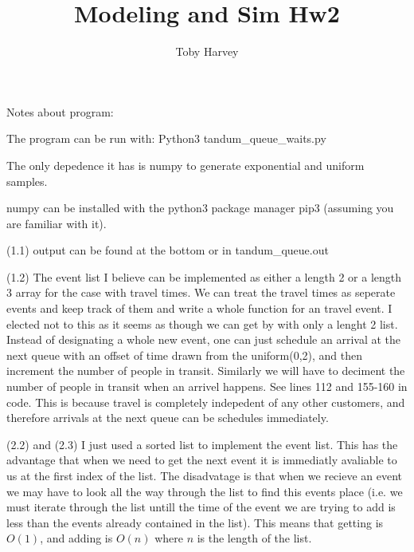 \documentclass{article}
\begin{document}
\title{Modeling and Sim Hw2}
\author{Toby Harvey}
\maketitle

\noindent Notes about program:

\vspace{3mm}

\noindent The program can be run with: Python3 tandum\_queue\_waits.py

\noindent The only depedence it has is numpy to generate exponential and uniform samples.

\noindent numpy can be installed with the python3 package manager pip3 (assuming you are familiar with it).

\vspace{3mm}

\noindent (1.1) output can be found at the bottom or in tandum\_queue.out

\vspace{3mm}

\noindent (1.2) The event list I believe can be implemented as either a length 2 or a length 3 array for the case with travel times. We can treat the travel times as seperate events and keep track of them and write a whole function for an travel event. I elected not to this as it seems as though we can get by with only a lenght 2 list. Instead of designating a whole new event, one can just schedule an arrival at the next queue with an offset of time drawn from the uniform(0,2), and then increment the number of people in transit. Similarly we will have to deciment the number of people in transit when an arrivel happens. See lines 112 and 155-160 in code. This is because travel is completely indepedent of any other customers, and therefore arrivals at the next queue can be schedules immediately.

\vspace{3mm}

\noindent (2.2) and (2.3) I just used a sorted list to implement the event list. This has the advantage that when we need to get the next event it is immediatly avaliable to us at the first index of the list. The disadvatage is that when we recieve an event we may have to look all the way through the list to find this events place (i.e. we must iterate through the list untill the time of the event we are trying to add is less than the events already contained in the list). This means that getting is $O(1)$, and adding is $O(n)$ where $n$ is the length of the list.
\end{document}
